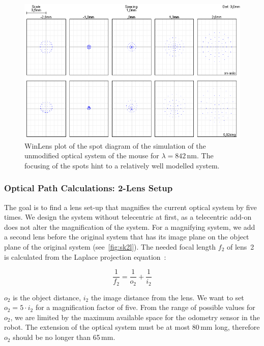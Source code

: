 \documentclass[12pt,a4paper]{article}
\begin{document}
\begin{figure}[htbp]
\begin{center}
\includegraphics[width=1\columnwidth]{figures/spot_diagram_mouse.png}
\caption{\label{fig:ls1_s}
WinLens plot of the spot diagram of the simulation of the unmodified optical system of the mouse for $\lambda = 842$\,nm.
The focusing of the spots hint to a relatively well modelled system.
}
\end{center}
\end{figure}

\subsubsection{Optical Path Calculations: 2-Lens Setup}
\label{opt:2l}

The goal is to find a lens set-up that magnifies the current optical system by five times.
We design the system without telecentric at first, as a telecentric add-on does not alter the magnification of the system.
For a magnifying system, we add a second lens before the original system that has its image plane on the object plane of the original system (see~\autoref{fig:sk2l}).
The needed focal length $f_2$ of lens~2 is calculated from the Laplace projection equation~\cite{jaeger}:%

\begin{equation}
\label{eq:1}
\frac{1}{f_2} = \frac{1}{o_2}  + \frac{1}{i_2}
\end{equation}

$o_2$ is the object distance, $i_2$ the image distance from the lens.
We want to set $o_2 = 5 \cdot i_2$ for a magnification factor of five.
From the range of possible values for $o_2$, we are limited by the maximum available space for the odometry sensor in the robot.
The extension of the optical system must be at most 80\,mm long, therefore $o_2$ should be no longer than 65\,mm.
\end{document}
